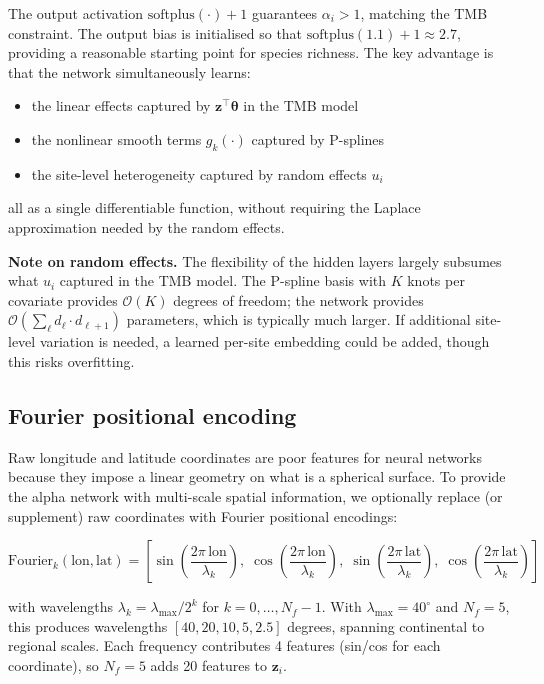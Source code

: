 \documentclass{article}
\begin{document}
The output activation $\text{softplus}(\cdot) + 1$ guarantees $\alpha_i > 1$, matching the TMB constraint. The output bias is initialised so that $\text{softplus}(1.1) + 1 \approx 2.7$, providing a reasonable starting point for species richness. The key advantage is that the network simultaneously learns:
\begin{itemize}
    \item the linear effects captured by $\mathbf{z}^\top\bm{\theta}$ in the TMB model
    \item the nonlinear smooth terms $g_k(\cdot)$ captured by P-splines
    \item the site-level heterogeneity captured by random effects $u_i$
\end{itemize}

all as a single differentiable function, without requiring the Laplace approximation needed by the random effects.

\textbf{Note on random effects.} The flexibility of the hidden layers largely subsumes what $u_i$ captured in the TMB model. The P-spline basis with $K$ knots per covariate provides $\mathcal{O}(K)$ degrees of freedom; the network provides $\mathcal{O}(\sum_\ell d_\ell \cdot d_{\ell+1})$ parameters, which is typically much larger. If additional site-level variation is needed, a learned per-site embedding could be added, though this risks overfitting.

\subsection{Fourier positional encoding}

Raw longitude and latitude coordinates are poor features for neural networks because they impose a linear geometry on what is a spherical surface. To provide the alpha network with multi-scale spatial information, we optionally replace (or supplement) raw coordinates with Fourier positional encodings:

\begin{equation}
    \text{Fourier}_k(\text{lon}, \text{lat}) = \left[\sin\!\left(\frac{2\pi\,\text{lon}}{\lambda_k}\right),\; \cos\!\left(\frac{2\pi\,\text{lon}}{\lambda_k}\right),\; \sin\!\left(\frac{2\pi\,\text{lat}}{\lambda_k}\right),\; \cos\!\left(\frac{2\pi\,\text{lat}}{\lambda_k}\right)\right]
\end{equation}

with wavelengths $\lambda_k = \lambda_{\max} / 2^k$ for $k = 0, \ldots, N_f - 1$. With $\lambda_{\max} = 40^\circ$ and $N_f = 5$, this produces wavelengths $[40, 20, 10, 5, 2.5]$ degrees, spanning continental to regional scales. Each frequency contributes 4 features (sin/cos for each coordinate), so $N_f = 5$ adds 20 features to $\mathbf{z}_i$.
\end{document}
